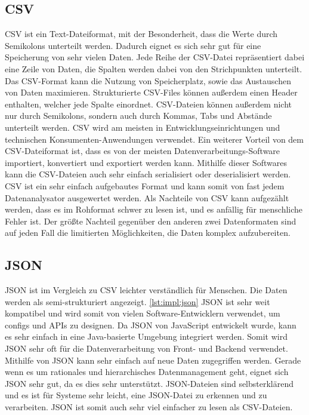     

\subsection{CSV}
CSV ist ein Text-Dateiformat, mit der Besonderheit, dass die Werte durch Semikolons unterteilt werden. Dadurch eignet es sich sehr gut für eine Speicherung von sehr vielen Daten. Jede Reihe der CSV-Datei repräsentiert dabei eine Zeile von Daten, die Spalten werden dabei von den Strichpunkten unterteilt. Das CSV-Format kann die Nutzung von Speicherplatz, sowie das Austauschen von Daten maximieren. Strukturierte CSV-Files können außerdem einen Header enthalten, welcher jede Spalte einordnet. CSV-Dateien können außerdem nicht nur durch Semikolons, sondern auch durch Kommas, Tabs und Abstände unterteilt werden. CSV wird am meisten in Entwicklungseinrichtungen und technischen Konsumenten-Anwendungen verwendet. Ein weiterer Vorteil von dem CSV-Dateiformat ist, dass es von der meisten Datenverarbeitungs-Software importiert, konvertiert und exportiert werden kann. Mithilfe dieser Softwares kann die CSV-Dateien auch sehr einfach serialisiert oder deserialisiert werden. CSV ist ein sehr einfach aufgebautes Format und kann somit von fast jedem Datenanalysator ausgewertet werden. Als Nachteile von CSV kann aufgezählt werden, dass es im Rohformat schwer zu lesen ist, und es anfällig für menschliche Fehler ist. Der größte Nachteil gegenüber den anderen zwei Datenformaten sind auf jeden Fall die limitierten Möglichkeiten, die Daten komplex aufzubereiten. \cite{csvOrJson} 


\subsection{JSON}
JSON ist im Vergleich zu CSV leichter verständlich für Menschen. Die Daten werden als semi-strukturiert angezeigt. \ref{lst:impl:json} JSON ist sehr weit kompatibel und wird somit von vielen Software-Entwicklern verwendet, um configs und APIs zu designen. Da JSON von JavaScript entwickelt wurde, kann es sehr einfach in eine Java-basierte Umgebung integriert werden. Somit wird JSON sehr oft für die Datenverarbeitung von Front- und Backend verwendet. Mithilfe von JSON kann sehr einfach auf neue Daten zugegriffen werden. Gerade wenn es um rationales und hierarchisches Datenmanagement geht, eignet sich JSON sehr gut, da es dies sehr unterstützt. JSON-Dateien sind selbsterklärend und es ist für Systeme sehr leicht, eine JSON-Datei zu erkennen und zu verarbeiten. JSON ist somit auch sehr viel einfacher zu lesen als CSV-Dateien. \cite{csvOrJson}



